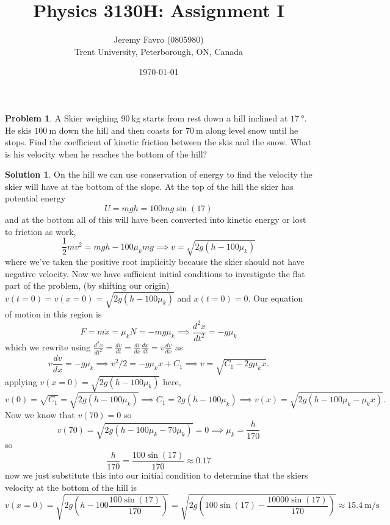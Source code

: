 \documentclass[10pt]{article}
\title{Physics 3130H: Assignment I}
\author{Jeremy Favro (0805980) \\ Trent University, Peterborough, ON, Canada}
\date{\today}
\theoremstyle{definition}
\newtheorem{problem}{Problem}
\newtheorem{soln}{Solution}
\begin{document}
\maketitle

\begin{problem}
A Skier weighing $\qty{90}{\kilo\gram}$ starts from rest down a hill inclined at $\qty{17}{\degree}$.
He skis $\qty{100}{\meter}$ down the hill and then coasts for $\qty{70}{\meter}$ along level snow until he stops.
Find the coefficient of kinetic friction between the skis and the snow. What is his velocity when he reaches the bottom of the hill?
\end{problem}
\begin{soln}
  On the hill we can use conservation of energy to find the velocity the skier will have at the bottom of the slope.
  At the top of the hill the skier has potential energy
  $$U=mgh=100mg\sin(17)$$
  and at the bottom all of this will have been converted into kinetic energy or lost to friction as work,
  $$\frac{1}{2}mv^2=mgh-100\mu_kmg\implies v=\sqrt{2g(h-100\mu_k)}$$
  where we've taken the positive root implicitly because the skier should not have negative velocity.
  Now we have sufficient initial conditions to investigate the flat part of the problem, (by shifting our origin) $v(t=0)=v(x=0)=\sqrt{2g(h-100\mu_k)}$ and $x(t=0)=0$.
  Our equation of motion in this region is
  $$F=m\ddot{x}=\mu_kN=-mg\mu_k\implies \frac{d^2x}{dt^2}=-g\mu_k$$
  which we rewrite using $\frac{d^2x}{dt^2}=\frac{dv}{dt}=\frac{dv}{dx}\frac{dx}{dt}=v\frac{dv}{dx}$ as
  $$v\frac{dv}{dx}=-g\mu_k\implies v^2/2=-g\mu_kx+C_1\implies v=\sqrt{C_1-2g\mu_kx}.$$
  applying $v(x=0)=\sqrt{2g(h-100\mu_k)}$ here,
  $$v(0)=\sqrt{C_1}=\sqrt{2g(h-100\mu_k)}\implies C_1=2g(h-100\mu_k)\implies v(x)=\sqrt{2g(h-100\mu_k-\mu_kx)}.$$
  Now we know that $v(70)=0$ so
  $$v(70)=\sqrt{2g(h-100\mu_k-70\mu_k)}=0\implies \mu_k=\frac{h}{170}$$
  so
  $$\frac{h}{170}=\frac{100\sin(17)}{170}\approx 0.17$$
  now we just substitute this into our initial condition to determine that the skiers velocity at the bottom of the hill is
  $$v(x=0)=\sqrt{2g(h-100\frac{100\sin(17)}{170})}=\sqrt{2g(100\sin(17)-\frac{10000\sin(17)}{170})}\approx \qty{15.4}{\meter\per\second}$$
\end{soln}
\newpage
\end{document}
